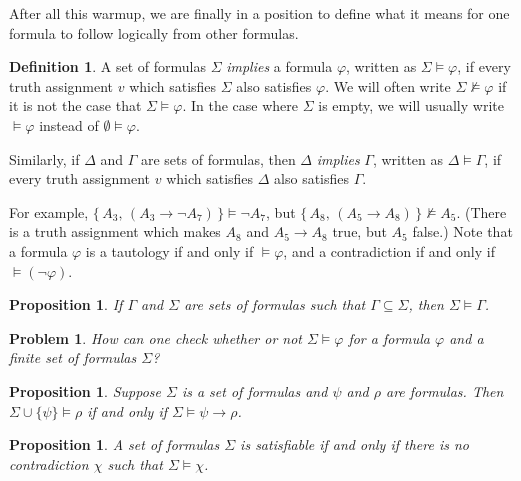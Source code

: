 \documentclass[12pt]{amsbook}
\newcommand{\nmodels}{\nvDash}
\theoremstyle{plain}
\newtheorem{prop}[thm]{Proposition}
\newtheorem{prob}[thm]{Problem}
\theoremstyle{definition}
\newtheorem{defn}{Definition}[chapter]
\theoremstyle{remark}
\begin{document}
After all this warmup,  we are finally in a position to define what it means for one formula to follow logically from other formulas.  

\begin{defn} \label{d:imp}  \index{$\models$} \index{$\nmodels$}
A set of formulas $\Sigma$ {\em implies\/} a formula $\varphi$,  written as $\Sigma \models \varphi$,  if every truth assignment $v$ which satisfies $\Sigma$ also satisfies $\varphi$.  We will often write $\Sigma \nmodels \varphi$ if it is not the case that $\Sigma \models \varphi$.  In the case where $\Sigma$ is empty,  we will usually write $\models \varphi$ instead of $\emptyset \models \varphi$.

Similarly,  if $\Delta$ and $\Gamma$ are sets of formulas,  then $\Delta$ {\em implies\/} $\Gamma$,  written as $\Delta \models \Gamma$,  if every truth assignment $v$ which satisfies $\Delta$ also satisfies $\Gamma$.
\end{defn}

For example,  $\{\, A_3 ,\, (A_3 \to \lnot A_7) \,\} \models \lnot A_7$,  but $\{\, A_8 ,\, (A_5 \to A_8) \,\} \nmodels A_5$.  (There is a truth assignment which makes $A_8$ and $A_5 \to A_8$ true,  but $A_5$ false.)  Note that a formula $\varphi$ is a tautology if and only if $\models \varphi$,  and a contradiction if and only if $\models (\lnot \varphi)$. 

\begin{prop} \label{p:two6a}
If $\Gamma$ and $\Sigma$ are sets of formulas such that $\Gamma \subseteq \Sigma$,  then $\Sigma \models \Gamma$.
\end{prop}

\begin{prob} \label{p:two7}
How can one check whether or not $\Sigma \models \varphi$ for a formula $\varphi$ and a finite set of formulas $\Sigma$?
\end{prob}

\begin{prop} \label{p:moto}
Suppose $\Sigma$ is a set of formulas and $\psi$ and $\rho$ are formulas.  Then $\Sigma \cup \{\psi\} \models \rho$ if and only if $\Sigma \models \psi \to \rho$.
\end{prop}

\begin{prop} \label{p:sanc}
A set of formulas $\Sigma$ is satisfiable if and only if there is no contradiction $\chi$ such that $\Sigma \models \chi$.
\end{prop}
\end{document}
